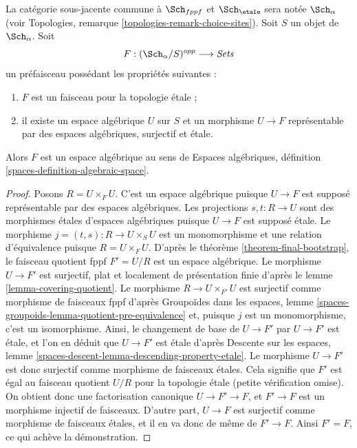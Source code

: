 \begin{lemma}
\label{lemma-spaces-etale-locally-representable}
La catégorie sous-jacente commune à $\Sch_{fppf}$ et $\Sch_\etale$ sera notée
$\Sch_\alpha$
(voir Topologies, remarque \ref{topologies-remark-choice-sites}).
Soit $S$ un objet de $\Sch_\alpha$. Soit
$$
F : (\Sch_\alpha/S)^{opp} \longrightarrow \textit{Sets}
$$
un préfaisceau possédant les propriétés suivantes :
\begin{enumerate}
\item $F$ est un faisceau pour la topologie étale ;
\item il existe un espace algébrique $U$ sur $S$
et un morphisme $U \to F$ représentable par
des espaces algébriques, surjectif et étale.
\end{enumerate}
Alors $F$ est un espace algébrique au sens de
Espaces algébriques, définition \ref{spaces-definition-algebraic-space}.
\end{lemma}

\begin{proof}
Posons $R = U \times_F U$. C'est un espace algébrique puisque $U \to F$ est supposé
représentable par des espaces algébriques. Les projections $s, t : R \to U$ sont des
morphismes étales d'espaces algébriques puisque $U \to F$ est supposé étale.
Le morphisme $j = (t, s) : R \to U \times_S U$ est un monomorphisme et une
relation d'équivalence puisque $R = U \times_F U$. D'après le
théorème \ref{theorem-final-bootstrap},
le faisceau quotient fppf $F' = U/R$ est un espace algébrique.
Le morphisme $U \to F'$ est surjectif, plat et localement de présentation
finie d'après le lemme \ref{lemma-covering-quotient}.
Le morphisme $R \to U \times_{F'} U$ est surjectif comme morphisme de faisceaux
fppf d'après Groupoïdes dans les espaces, lemme
\ref{spaces-groupoids-lemma-quotient-pre-equivalence}
et, puisque $j$ est un monomorphisme, c'est un isomorphisme.
Ainsi, le changement de base de $U \to F'$ par $U \to F'$ est étale,
et l'on en déduit que $U \to F'$ est étale d'après
Descente sur les espaces, lemme \ref{spaces-descent-lemma-descending-property-etale}.
Le morphisme $U \to F'$ est donc surjectif comme morphisme de faisceaux étales.
Cela signifie que $F'$ est égal au faisceau quotient $U/R$
pour la topologie étale (petite vérification omise). On obtient donc
une factorisation canonique $U \to F' \to F$, et $F' \to F$ est un morphisme
injectif de faisceaux. D'autre part, $U \to F$ est surjectif comme morphisme
de faisceaux étales, et il en va donc de même de $F' \to F$. Ainsi $F' = F$,
ce qui achève la démonstration.
\end{proof}

